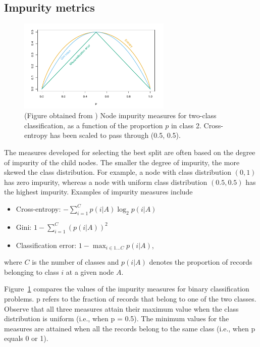 \subsection{Impurity metrics} %
\label{sub:impurity_metrics}
\begin{figure}[h!tb]
    \begin{center}
        \includegraphics[width=0.65\textwidth]{figures/impurity_measures}
    \end{center}
    \caption{(Figure obtained from \cite{hastie2008statisticallearning})
Node impurity measures for two-class classification, as a function of the
proportion $p$ in class 2. Cross-entropy has been scaled to pass through (0.5, 0.5).}
    \label{fig:impurity_measures}
\end{figure}

The measures developed for selecting the best split are often based on the
degree of impurity of the child nodes. The smaller the degree of impurity,
the more skewed the class distribution.  For example, a node with class
distribution $(0, 1)$ has zero impurity, whereas a node with uniform class
distribution $(0.5, 0.5)$ has the highest impurity. Examples of impurity
measures include

\begin{itemize}
    \item Cross-entropy: $- \displaystyle \sum_{i=1}^{C}p(i|A)\log_2 p(i|A)$
    \item Gini: $1 - \displaystyle \sum_{i=1}^{C} \left(p(i|A)\right)^2$
    \item Classification error: $1 - \displaystyle \max_{i \in 1\ldots C} p(i|A)$,
\end{itemize}
where $C$ is the number of classes and $p(i|A)$ denotes the proportion of records
belonging to class $i$ at a given node $A$.

Figure~\ref{fig:impurity_measures} compares the values of the impurity measures
for binary classification problems. p refers to the fraction of records that
belong to one of the two classes. Observe that all three measures attain their
maximum value when the class distribution is uniform (i.e., when p = 0.5). The
minimum values for the measures are attained when all the records belong to the
same class (i.e., when p equals 0 or 1).

